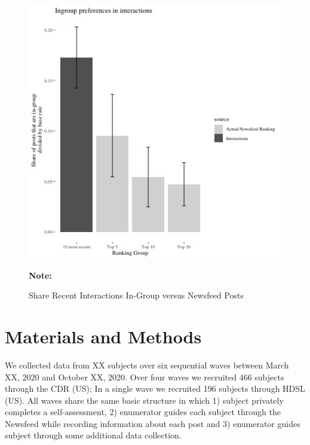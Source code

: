 \documentclass[12pt,letterpaper]{article}
\begin{document}
\begin{figure}[!h]
    \caption{Share Recent Interactions In-Group versus Newsfeed Posts}
    \label{fig:behavior}
    \begin{center}
    \includegraphics[scale=.7, trim={0 0 0cm 2cm}, clip]{Output/Graphs/Audit/Interactions/US preferences reactions and actual rankings above base rate.jpg}
    \end{center}
\footnotesize 
\textbf{Note:} 
\end{figure}

\FloatBarrier
\clearpage
\appendix
\renewcommand\thefigure{\thesection.\arabic{figure}}
\renewcommand\thetable{\thesection.\arabic{table}}


\section{Materials and Methods}\label{app:materials}

We collected data from XX subjects over six sequential waves between March XX, 2020 and October XX, 2020. Over four waves we recruited 466 subjects through the CDR (US); In a single wave we recruited 196 subjects through HDSL (US). All waves share the same basic structure in which 1) subject privately completes a self-assessment, 2) enumerator guides each subject through the Newsfeed while recording information about each post and 3) enumerator guides subject through some additional data collection.
\end{document}
